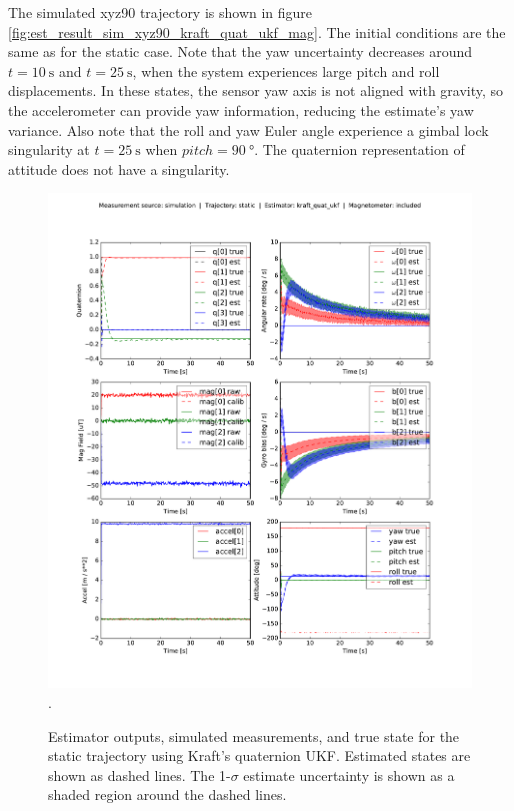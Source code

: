 \documentclass[conference]{IEEEtran}
\begin{document}
The simulated xyz90 trajectory is shown in figure \ref{fig:est_result_sim_xyz90_kraft_quat_ukf_mag}. The initial conditions are the same as for the static case. Note that the yaw uncertainty decreases around $t=\SI{10}{\second}$ and $t = \SI{25}{\second}$, when the system experiences large pitch and roll displacements. In these states, the sensor yaw axis is not aligned with gravity, so the accelerometer can provide yaw information, reducing the estimate's yaw variance. Also note that the roll and yaw Euler angle experience a gimbal lock singularity at $t = \SI{25}{\second}$ when $pitch=\SI{90}{\degree}$. The quaternion representation of attitude does not have a singularity. 

\begin{figure}[!t]
  \centering
  \includegraphics[width=7.5in]{figures/est_result_sim_static_kraft_quat_ukf_mag.pdf}
  \DeclareGraphicsExtensions.
  \caption{Estimator outputs, simulated measurements, and true state for the static trajectory using Kraft's quaternion UKF. Estimated states are shown as dashed lines. The 1-$\sigma$ estimate uncertainty is shown as a shaded region around the dashed lines.}
  \label{fig:est_result_sim_static_kraft_quat_ukf_mag}
\end{figure}
\end{document}
